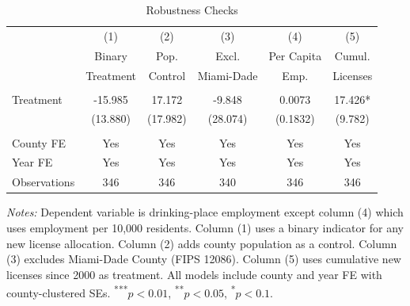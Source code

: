 \begin{table}[htbp]
\centering
\caption{Robustness Checks}
\label{tab:robust}
\begin{tabular}{lccccc}
\hline\hline
 & (1) & (2) & (3) & (4) & (5) \\
 & Binary & Pop. & Excl. & Per Capita & Cumul. \\
 & Treatment & Control & Miami-Dade & Emp. & Licenses \\
\hline
\\[-1.8ex]
Treatment & -15.985 & 17.172 & -9.848 & 0.0073 & 17.426* \\
 & (13.880) & (17.982) & (28.074) & (0.1832) & (9.782) \\
\\[-1.8ex]
County FE & Yes & Yes & Yes & Yes & Yes \\
Year FE & Yes & Yes & Yes & Yes & Yes \\
Observations & 346 & 346 & 340 & 346 & 346 \\
\hline\hline
\end{tabular}
\begin{tablenotes}
\small
\item \textit{Notes:} Dependent variable is drinking-place employment except column (4) which uses employment per 10,000 residents. Column (1) uses a binary indicator for any new license allocation. Column (2) adds county population as a control. Column (3) excludes Miami-Dade County (FIPS 12086). Column (5) uses cumulative new licenses since 2000 as treatment. All models include county and year FE with county-clustered SEs. \textsuperscript{***}$p<0.01$, \textsuperscript{**}$p<0.05$, \textsuperscript{*}$p<0.1$.
\end{tablenotes}
\end{table}
